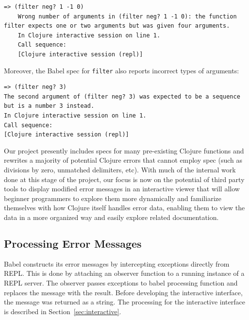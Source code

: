 \documentclass[12pt]{article}
\begin{document}
\begin{lstlisting}[breaklines=true, basicstyle=\ttfamily]
    => (filter neg? 1 -1 0)
    Wrong number of arguments in (filter neg? 1 -1 0): the function filter expects one or two arguments but was given four arguments.
    In Clojure interactive session on line 1.
    Call sequence:
    [Clojure interactive session (repl)]
\end{lstlisting}

Moreover, the Babel spec for \texttt{filter} also reports incorrect types of arguments:

\begin{lstlisting}[breaklines=true, basicstyle=\ttfamily]
=> (filter neg? 3)
The second argument of (filter neg? 3) was expected to be a sequence but is a number 3 instead.
In Clojure interactive session on line 1.
Call sequence:
[Clojure interactive session (repl)]
\end{lstlisting}

Our project presently includes specs for many pre-existing Clojure functions and rewrites a majority of potential Clojure errors that cannot employ spec (such as divisions by zero, unmatched delimiters, etc). With much of the internal work done at this stage of the project, our focus is now on the potential of third party tools to display modified error messages in an interactive viewer that will allow beginner programmers to explore them more dynamically and familiarize themselves with how Clojure itself handles error data, enabling them to view the data in a more organized way and easily explore related documentation.

\subsection{Processing Error Messages}\label{subsec:classification}
Babel constructs its error messages by intercepting exceptions directly from REPL. This is done by attaching an observer function to a running instance of a REPL server. The observer passes exceptions to babel processing 
function and replaces the message with the result. 
Before developing the interactive interface, the message was returned as a string. 
The processing for the interactive interface is described in Section~\ref{sec:interactive}.
\end{document}
